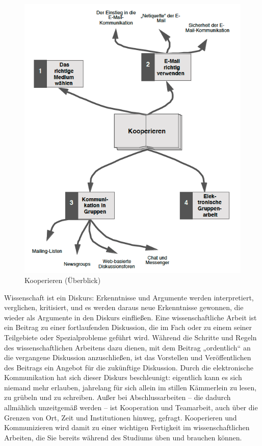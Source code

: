 \documentclass[]{book}
\theoremstyle{definition}
\theoremstyle{definition}
\theoremstyle{definition}
\theoremstyle{remark}
\begin{document}
\begin{figure}

{\centering \includegraphics{images/kooperieren-min} 

}

\caption{Kooperieren (Überblick)}\label{fig:unnamed-chunk-14}
\end{figure}

Wissenschaft ist ein Diskurs: Erkenntnisse und Argumente werden
interpretiert, verglichen, kritisiert, und es werden daraus neue
Erkenntnisse gewonnen, die wieder als Argumente in den Diskurs
einfließen. Eine wissenschaftliche Arbeit ist ein Beitrag zu einer
fortlaufenden Diskussion, die im Fach oder zu einem seiner Teilgebiete
oder Spezialprobleme geführt wird. Während die Schritte und Regeln des
wissenschaftlichen Arbeitens dazu dienen, mit dem Beitrag „ordentlich``
an die vergangene Diskussion anzuschließen, ist das Vorstellen und
Veröffentlichen des Beitrags ein Angebot für die zukünftige Diskussion.
Durch die elektronische Kommunikation hat sich dieser Diskurs
beschleunigt: eigentlich kann es sich niemand mehr erlauben, jahrelang
für sich allein im stillen Kämmerlein zu lesen, zu grübeln und zu
schreiben. Außer bei Abschlussarbeiten -- die dadurch allmählich
unzeitgemäß werden -- ist Kooperation und Teamarbeit, auch über die
Grenzen von Ort, Zeit und Institutionen hinweg, gefragt. Kooperieren und
Kommunizieren wird damit zu einer wichtigen Fertigkeit im
wissenschaftlichen Arbeiten, die Sie bereits während des Studiums üben
und brauchen können.
\end{document}
